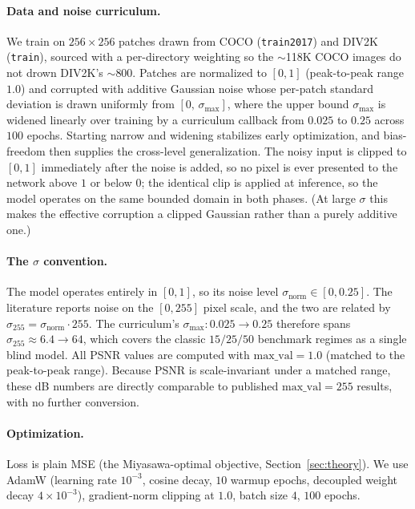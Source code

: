 \documentclass{article}
\newcommand{\sigpx}{\sigma_{255}}
\begin{document}
\paragraph{Data and noise curriculum.}
We train on $256{\times}256$ patches drawn from COCO (\texttt{train2017}) and DIV2K (\texttt{train}), sourced with a per-directory weighting so the $\sim$118K COCO images do not drown DIV2K's $\sim$800. Patches are normalized to $[0,1]$ (peak-to-peak range $1.0$) and corrupted with additive Gaussian noise whose per-patch standard deviation is drawn uniformly from $[0,\, \sigma_{\max}]$, where the upper bound $\sigma_{\max}$ is widened linearly over training by a curriculum callback from $0.025$ to $0.25$ across $100$ epochs. Starting narrow and widening stabilizes early optimization, and bias-freedom then supplies the cross-level generalization. The noisy input is clipped to $[0,1]$ immediately after the noise is added, so no pixel is ever presented to the network above $1$ or below $0$; the identical clip is applied at inference, so the model operates on the same bounded domain in both phases. (At large $\sigma$ this makes the effective corruption a clipped Gaussian rather than a purely additive one.)

\paragraph{The $\sigma$ convention.}
The model operates entirely in $[0,1]$, so its noise level $\sigma_{\mathrm{norm}} \in [0, 0.25]$. The literature reports noise on the $[0,255]$ pixel scale, and the two are related by $\sigpx = \sigma_{\mathrm{norm}} \cdot 255$. The curriculum's $\sigma_{\max}: 0.025 \to 0.25$ therefore spans $\sigpx \approx 6.4 \to 64$, which covers the classic $15/25/50$ benchmark regimes as a single blind model. All PSNR values are computed with $\mathrm{max\_val}=1.0$ (matched to the peak-to-peak range). Because PSNR is scale-invariant under a matched range, these dB numbers are directly comparable to published $\mathrm{max\_val}=255$ results, with no further conversion.

\paragraph{Optimization.}
Loss is plain MSE (the Miyasawa-optimal objective, Section~\ref{sec:theory}). We use AdamW (learning rate $10^{-3}$, cosine decay, $10$ warmup epochs, decoupled weight decay $4\times10^{-3}$), gradient-norm clipping at $1.0$, batch size $4$, $100$ epochs.
\end{document}
